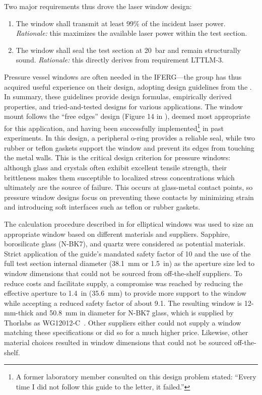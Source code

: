             Two major requirements thus drove the laser window design:
            \begin{enumerate}
                \item The window shall transmit at least 99\% of the incident laser power. \emph{Rationale:} this maximizes the available laser power within the test section.
                \item The window shall seal the test section at 20~bar and remain structurally sound. \emph{Rationale:} this directly derives from requirement LTTLM-3.
            \end{enumerate}

            Pressure vessel windows are often needed in the IFERG---the group has thus acquired useful experience on their design, adopting design guidelines from the \textcite{brookhavennationallaboratoryGuideGlassPlastic2005}. In summary, these guidelines provide design formulas, empirically derived properties, and tried-and-tested designs for various applications. The window mount follows the ``free edges'' design (Figure 14 in \cite{brookhavennationallaboratoryGuideGlassPlastic2005}), deemed most appropriate for this application, and having been successfully implemented\footnote{A former laboratory member consulted on this design problem stated: ``Every time I did not follow this guide to the letter, it failed.''} in past experiments. In this design, a peripheral o-ring provides a reliable seal, while two rubber or teflon gaskets support the window and prevent its edges from touching the metal walls. This is the critical design criterion for pressure windows: although glass and crystals often exhibit excellent tensile strength, their brittleness makes them susceptible to localized stress concentrations which ultimately are the source of failure. This occurs at glass-metal contact points, so pressure window designs focus on preventing these contacts by minimizing strain and introducing soft interfaces such as teflon or rubber gaskets.

            The calculation procedure described in \cite{brookhavennationallaboratoryGuideGlassPlastic2005} for elliptical windows was used to size an appropriate window based on different materials and suppliers. Sapphire, borosilicate glass (N-BK7), and quartz were considered as potential materials. Strict application of the guide's mandated safety factor of 10 and the use of the full test section internal diameter (\qty{38.1}{mm} or 1.5~in) as the aperture size led to window dimensions that could not be sourced from off-the-shelf suppliers. To reduce costs and facilitate supply, a compromise was reached by reducing the effective aperture to 1.4~in (\qty{35.6}{mm}) to provide more support to the window while accepting a reduced safety factor of about 9.1. The resulting window is 12-mm-thick and \qty{50.8}{mm} in diameter for N-BK7 glass, which is supplied by Thorlabs as WG12012-C~\cite{thorlabsWG12012CO2NBK7}. Other suppliers either could not supply a window matching these specifications or did so for a much higher price. Likewise, other material choices resulted in window dimensions that could not be sourced off-the-shelf.

